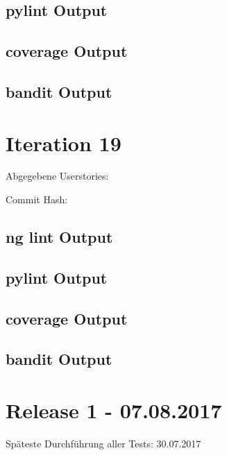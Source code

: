 \documentclass[accentcolor=tud0b,12pt,paper=a4]{tudreport}
\begin{document}
	\subsection*{pylint Output}
	
	
	\subsection*{coverage Output}
	
	
	\subsection*{bandit Output}
	

\section*{Iteration 19}
	Abgegebene Userstories:
	
	Commit Hash: 
	
	\subsection*{ng lint Output}
%	
	
	\subsection*{pylint Output}
	
	
	\subsection*{coverage Output}
	
	
	\subsection*{bandit Output}
	

\section*{Release 1 - 07.08.2017}
Späteste Durchführung aller Tests: 30.07.2017
\end{document}
